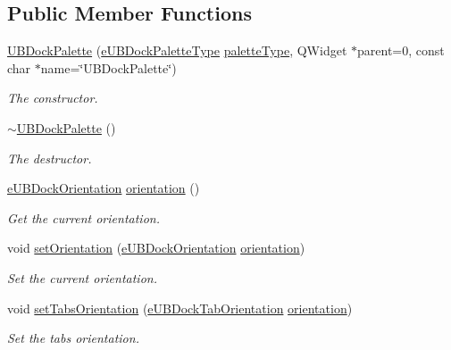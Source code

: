 \subsection*{Public Member Functions}
\begin{DoxyCompactItemize}
\item 
\hyperlink{class_u_b_dock_palette_a6f6fcc9a6785126f2e668742c886905e}{U\-B\-Dock\-Palette} (\hyperlink{_u_b_dock_palette_8h_a63e99c0675ae955b642f5e77e3070053}{e\-U\-B\-Dock\-Palette\-Type} \hyperlink{class_u_b_dock_palette_a51cb7edc01ac73cee66f66ae6788aebb}{palette\-Type}, Q\-Widget $\ast$parent=0, const char $\ast$name=\char`\"{}U\-B\-Dock\-Palette\char`\"{})
\begin{DoxyCompactList}\small\item\em The constructor. \end{DoxyCompactList}\item 
\hyperlink{class_u_b_dock_palette_aeeae7b5c5df8bf926eca889c152305a7}{$\sim$\-U\-B\-Dock\-Palette} ()
\begin{DoxyCompactList}\small\item\em The destructor. \end{DoxyCompactList}\item 
\hyperlink{_u_b_dock_palette_8h_a697273b91063b41b5f17e942bcc445c4}{e\-U\-B\-Dock\-Orientation} \hyperlink{class_u_b_dock_palette_a92148a9db7361b6f037eda1213cde579}{orientation} ()
\begin{DoxyCompactList}\small\item\em Get the current orientation. \end{DoxyCompactList}\item 
void \hyperlink{class_u_b_dock_palette_afda3d41a81d60507554924807ebaec2b}{set\-Orientation} (\hyperlink{_u_b_dock_palette_8h_a697273b91063b41b5f17e942bcc445c4}{e\-U\-B\-Dock\-Orientation} \hyperlink{class_u_b_dock_palette_a92148a9db7361b6f037eda1213cde579}{orientation})
\begin{DoxyCompactList}\small\item\em Set the current orientation. \end{DoxyCompactList}\item 
void \hyperlink{class_u_b_dock_palette_a24bb9bb5340b91027148ddd802dc4f63}{set\-Tabs\-Orientation} (\hyperlink{_u_b_dock_palette_8h_a8417e31f28356d29373f251be2649a87}{e\-U\-B\-Dock\-Tab\-Orientation} \hyperlink{class_u_b_dock_palette_a92148a9db7361b6f037eda1213cde579}{orientation})
\begin{DoxyCompactList}\small\item\em Set the tabs orientation. \end{DoxyCompactList}\item 

\end{DoxyCompactItemize}
